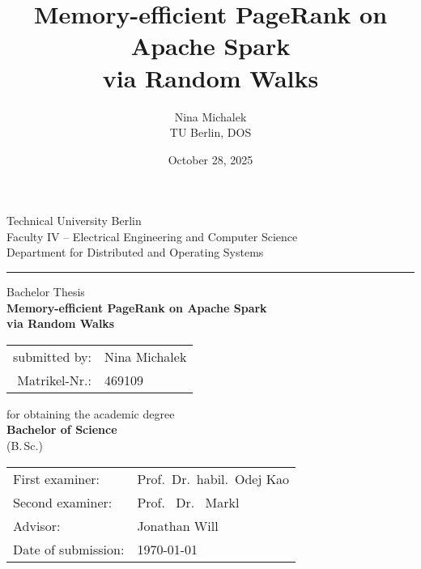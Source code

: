 \documentclass[a4paper,12pt]{article}
\title{Memory-efficient PageRank on Apache Spark\\ via Random Walks}
\author{Nina Michalek \\ TU Berlin, DOS}
\date{October 28, 2025}
\begin{document}
\begin{titlepage}
\setlength{\parindent}{0pt}



\vspace{8mm}


{\raggedright
Technical University Berlin\\
Faculty IV -- Electrical Engineering and Computer Science\\
Department for Distributed and Operating Systems\par
}
\vspace{8mm}
\hrule   %
\vspace{10mm}

\vspace{15mm}

\begin{center}
\Large Bachelor Thesis\\[15mm]
\Huge \textbf{Memory-efficient PageRank on Apache Spark\\ via Random Walks}
\end{center}

\vspace{10mm}

\begin{center}
\begin{tabular}{rl}
submitted by: & Nina Michalek \\
Matrikel-Nr.: & 469109 \\
\end{tabular}
\end{center}

\vspace{8mm}

\begin{center}
\onehalfspacing
for obtaining the academic degree \\
\large \textbf{Bachelor of Science} \\
\normalsize (B.\,Sc.)
\end{center}

\vfill

\onehalfspacing
\begin{tabular}{@{}ll}
First examiner: & Prof.\ Dr.\ habil.\ Odej Kao\\
Second examiner: & Prof. \ Dr. \ Markl \\
Advisor: & Jonathan Will\\
Date of submission: & \today
\end{tabular}

\end{titlepage}

\tableofcontents
\newpage


\newpage

\newpage

\newpage

\newpage

\newpage

\newpage

\end{document}
